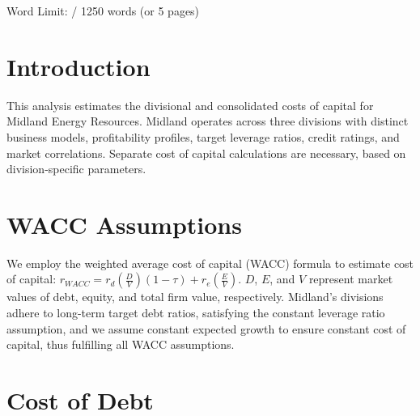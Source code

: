 \documentclass[AER]{AEA}
\title{}
\begin{document}
\thispagestyle{empty}
    \vspace*{\fill}
        \begin{spacing}{1.5}
        \begin{center}
        \Huge
        
        \vspace{1.5cm}
            
        \huge
        Word Limit: / 1250 words (or 5 pages)
        \end{center}
        \end{spacing}
        \vspace*{\fill}
\newpage

\pagestyle{fancy}

\setcounter{page}{1}

\begin{spacing}{1.5}


\section{Introduction}

This analysis estimates the divisional and consolidated costs of capital for Midland Energy Resources. Midland operates across three divisions with distinct business models, profitability profiles, target leverage ratios, credit ratings, and market correlations. Separate cost of capital calculations are necessary, based on division-specific parameters.

\section{WACC Assumptions}

We employ the weighted average cost of capital (WACC) formula to estimate cost of capital: $r_{W\!ACC}=r_d\left(\frac{D}{V}\right)(1-\tau)+r_e\left(\frac{E}{V}\right)$. $D$, $E$, and $V$ represent market values of debt, equity, and total firm value, respectively. Midland’s divisions adhere to long-term target debt ratios, satisfying the constant leverage ratio assumption, and we assume constant expected growth to ensure constant cost of capital, thus fulfilling all WACC assumptions.

\section{Cost of Debt}


\end{spacing}
\end{document}
